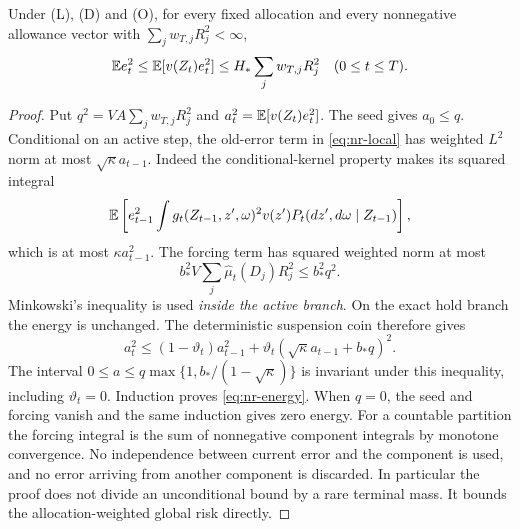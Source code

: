 \begin{lemma}\label{lem:nr-energy}
Under \textup{(L)}, \textup{(D)} and \textup{(O)}, for every fixed allocation and every nonnegative allowance vector with $\sum_jw_{T,j}R_j^2<\infty$,
\begin{equation}\label{eq:nr-energy}
 \mathbb E e_t^2\le\mathbb E[v(Z_t)e_t^2]\le H_*\sum_jw_{T,j}R_j^2
                    \quad(0\le t\le T).
\end{equation}
\end{lemma}
\begin{proof}
Put $q^2=VA\sum_jw_{T,j}R_j^2$ and $a_t^2=\mathbb E[v(Z_t)e_t^2]$. The seed gives $a_0\le q$. Conditional on an active step, the old-error term in \eqref{eq:nr-local} has weighted $L^2$ norm at most $\sqrt\kappa a_{t-1}$. Indeed the conditional-kernel property makes its squared integral
\[
 \mathbb E\left[e_{t-1}^2\int g_t(Z_{t-1},z',\omega)^2v(z')
                              P_t(dz',d\omega\mid Z_{t-1})\right],
\]
which is at most $\kappa a_{t-1}^2$. The forcing term has squared weighted norm at most
\[
 b_*^2V\sum_j\widehat\mu_t(D_j)R_j^2\le b_*^2q^2.
\]
Minkowski's inequality is used \emph{inside the active branch}. On the exact hold branch the energy is unchanged. The deterministic suspension coin therefore gives
\begin{equation}\label{eq:nr-mixture}
 a_t^2\le(1-\vartheta_t)a_{t-1}^2+
                  \vartheta_t(\sqrt\kappa a_{t-1}+b_*q)^2.
\end{equation}
The interval $0\le a\le q\max\{1,b_* /(1-\sqrt\kappa)\}$ is invariant under this inequality, including $\vartheta_t=0$. Induction proves \eqref{eq:nr-energy}. When $q=0$, the seed and forcing vanish and the same induction gives zero energy. For a countable partition the forcing integral is the sum of nonnegative component integrals by monotone convergence. No independence between current error and the component is used, and no error arriving from another component is discarded. In particular the proof does not divide an unconditional bound by a rare terminal mass. It bounds the allocation-weighted global risk directly.
\end{proof}

